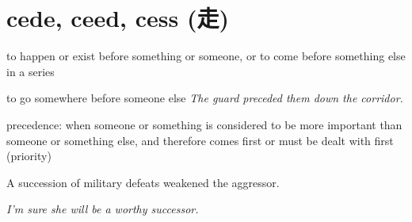 \chapter{cede, ceed, cess (走)}

\begin{vocabulary}[excessive]
\end{vocabulary}

\begin{vocabulary}[exceed]
\end{vocabulary}

\begin{vocabulary}[proceed]
\end{vocabulary}

\begin{vocabulary}
    to happen or exist before something or someone, or to come before something else in a series

    to go somewhere before someone else
    \textit{The guard preceded them down the corridor.}

    precedence: when someone or something is considered to be more important than someone or something else, and therefore comes first or must be dealt with first (priority)
\end{vocabulary}

\begin{vocabulary}[succession]
    A succession of military defeats weakened the aggressor.
\end{vocabulary}

\begin{vocabulary}[successor]
    \textit{I'm sure she will be a worthy successor.}
\end{vocabulary}